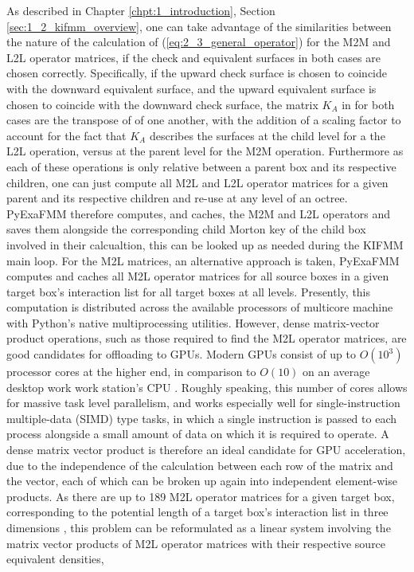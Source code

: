 As described in Chapter \ref{chpt:1_introduction}, Section \ref{sec:1_2_kifmm_overview}, one
can take advantage of the similarities between the nature of the calculation of
(\ref{eq:2_3_general_operator}) for the \gls{M2M} and \gls{L2L} operator matrices, if
the check and equivalent surfaces in both cases are chosen correctly. Specifically,
if the upward check surface is chosen to coincide with the downward equivalent
surface, and the upward equivalent surface is chosen to coincide with the
downward check surface, the matrix $K_A$ in for both cases are the transpose of
of one another, with the addition of a scaling factor to account for the fact
that $K_A$ describes the surfaces at the child level for a the \gls{L2L} operation,
versus at the parent level for the \gls{M2M} operation. Furthermore as each of these
operations is only relative between a parent box and its respective children, one
can just compute all M2L and L2L operator matrices for a given parent and its
respective children and re-use at any level of an octree. \gls{PyExaFMM} therefore
computes, and caches, the M2M and L2L operators and saves them alongside the
corresponding child Morton \gls{key} of the child box involved in their calcualtion,
 this can be looked up as needed during the \gls{KIFMM} main loop. For the M2L
 matrices, an alternative approach is taken, \gls{PyExaFMM} computes
and caches all M2L operator matrices for all source boxes in a given target box's
interaction list for all target boxes at all levels. Presently, this computation is distributed across
the available processors of multicore machine
with Python's native multiprocessing utilities. However, dense matrix-vector
product operations, such as those required to find the \gls{M2L} operator
matrices, are good candidates for offloading to \gls{GPU}s. Modern \gls{GPU}s
consist of up to $O(10^3)$ processor cores at the higher end,
in comparison to $O(10)$ on an average desktop work work station's CPU
\cite{Hwu:2011:MKP}. Roughly speaking, this number of cores allows for massive task level parallelism,
and works especially well for single-instruction multiple-data (\gls{SIMD}) type tasks, in which
a single instruction is passed to each process alongside a small amount of data on which it
is required to operate. A dense matrix vector product is therefore an ideal
candidate for GPU acceleration, due to the independence of the calculation between each row
of the matrix and the vector, each of which can be broken up again into independent element-wise
products. As there are up to 189 M2L operator matrices for a given
target box, corresponding to the potential length of a target box's interaction
list in three dimensions \cite{Ying:2004:JCP}, this problem can be reformulated
as a linear system involving the matrix vector products of M2L operator matrices
with their respective source equivalent densities,

